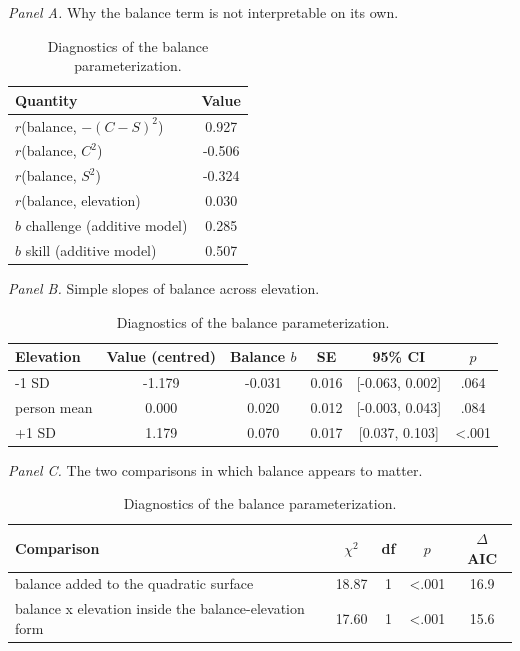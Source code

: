 \begin{table}[!htbp]
\raggedright
\caption{Diagnostics of the balance parameterization.}
\label{tab:sup-baldiag}
\footnotesize
\begingroup
\setlength{\tabcolsep}{4pt}
\renewcommand{\arraystretch}{1.08}
\noindent\textit{Panel A.} Why the balance term is not interpretable on its own.\par\vspace{2pt}
\begin{tabular*}{\textwidth}{@{\extracolsep{\fill}}lc@{}}
\toprule
Quantity & Value \\
\midrule
$r$(balance, $-(C-S)^2$) & 0.927 \\
$r$(balance, $C^2$) & -0.506 \\
$r$(balance, $S^2$) & -0.324 \\
$r$(balance, elevation) & 0.030 \\
$b$ challenge (additive model) & 0.285 \\
$b$ skill (additive model) & 0.507 \\
\bottomrule
\end{tabular*}
\par\vspace{6pt}\noindent\textit{Panel B.} Simple slopes of balance across elevation.\par\vspace{2pt}
\begin{tabular*}{\textwidth}{@{\extracolsep{\fill}}lccccc@{}}
\toprule
Elevation & Value (centred) & Balance $b$ & SE & 95\% CI & $p$ \\
\midrule
-1 SD & -1.179 & -0.031 & 0.016 & [-0.063, 0.002] & .064 \\
person mean & 0.000 & 0.020 & 0.012 & [-0.003, 0.043] & .084 \\
+1 SD & 1.179 & 0.070 & 0.017 & [0.037, 0.103] & <.001 \\
\bottomrule
\end{tabular*}
\par\vspace{6pt}\noindent\textit{Panel C.} The two comparisons in which balance appears to matter.\par\vspace{2pt}
\begin{tabular*}{\textwidth}{@{\extracolsep{\fill}}lcccc@{}}
\toprule
Comparison & $\chi^2$ & df & $p$ & $\Delta$ AIC \\
\midrule
balance added to the quadratic surface & 18.87 & 1 & <.001 & 16.9 \\
balance x elevation inside the balance-elevation form & 17.60 & 1 & <.001 & 15.6 \\

\end{tabular*}
\end{table}
